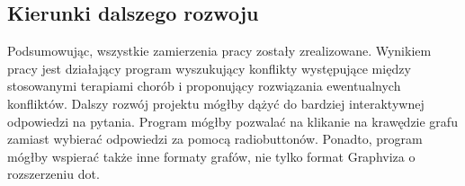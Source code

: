 \documentclass[oneside,a4paper]{book}
\begin{document}
\begin{spacing}{1.5}
\section{Kierunki dalszego rozwoju}

Podsumowując, wszystkie zamierzenia pracy zostały zrealizowane. Wynikiem pracy jest działający program wyszukujący konflikty występujące między stosowanymi terapiami chorób i proponujący rozwiązania ewentualnych konfliktów. Dalszy rozwój projektu mógłby dążyć do bardziej interaktywnej odpowiedzi na pytania. Program mógłby pozwalać na klikanie na krawędzie grafu zamiast wybierać odpowiedzi za pomocą radiobuttonów. Ponadto, program mógłby wspierać także inne formaty grafów, nie tylko format Graphviza o rozszerzeniu dot. 

\backmatter
{}



\end{spacing}
\end{document}
